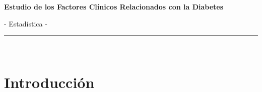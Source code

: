 \documentclass[12pt, oneside openany]{apa7}
\begin{document}
\begin{titlepage}
\vspace{0.5cm}
\noindent
\huge
\textbf{Estudio de los Factores Clínicos Relacionados con  la Diabetes}
\vspace{0.2cm}
\Large
\par
\noindent
- Estadística -\\
\rule[0.3cm]{\linewidth}{2pt}
\Large


\noindent

\begin{center}
\vspace{1cm}
\noindent
\large
\thesisAuthor\\
\vspace{2 cm}
\small
\par \textbf{\thesisDegree} 
\par
\textit{\university}
\par 
\faculty
\par  
\company
\par 
\end{center}
\end{titlepage}

\thispagestyle{empty}
\tableofcontents

\pagebreak

\thispagestyle{empty}
\listoftables    

\pagebreak

\thispagestyle{empty}
\listoffigures  




\AtBeginShipout
{
}

{\newpage\renewcommand{\thepage}{\arabic{page}}\setcounter{page}{1}}

\AtBeginShipout
{
\AddToShipoutPictureBG*{%
  \AtPageLowerLeft{%
    \color{pagina}%
    \rule{0.0109\paperwidth}{\paperheight}%
  }%
}%
}


\section{Introducción}
\end{document}

